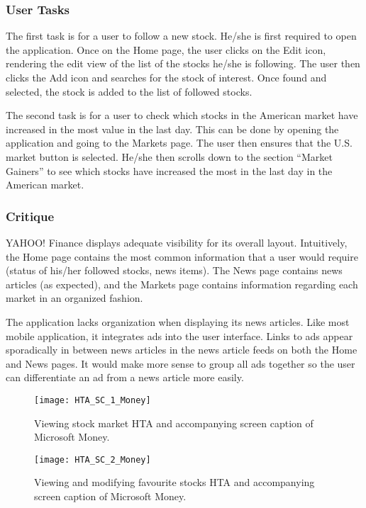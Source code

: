 \documentclass{sigchi}
\begin{document}
\subsubsection{User Tasks}
The first task is for a user to follow a new stock. He/she is first required to open the application. Once on the Home page, the user clicks on the Edit icon, rendering the edit view of the list of the stocks he/she is following. The user then clicks the Add icon and searches for the stock of interest. Once found and selected, the stock is added to the list of followed stocks.\par

The second task is for a user to check which stocks in the American market have increased in the most value in the last day. This can be done by opening the application and going to the Markets page. The user then ensures that the U.S. market button is selected. He/she then scrolls down to the section “Market Gainers” to see which stocks have increased the most in the last day in the American market.


\subsubsection{Critique}
YAHOO! Finance displays adequate visibility for its overall layout. Intuitively, the Home page contains the most common information that a user would require (status of his/her followed stocks, news items). The News page contains news articles (as expected), and the Markets page contains information regarding each market in an organized fashion. \par

The application lacks organization when displaying its news articles. Like most mobile application, it integrates ads into the user interface. Links to ads appear sporadically in between news articles in the news article feeds on both the Home and News pages. It would make more sense to group all ads together so the user can differentiate an ad from a news article more easily. 


\begin{figure*}
	\texttt{[image: HTA\_SC\_1\_Money]}
	\caption{Viewing stock market HTA and accompanying screen caption of Microsoft Money.}
	\label{fig:figure1}
\end{figure*}

\begin{figure*}
	\texttt{[image: HTA\_SC\_2\_Money]}
	\caption{Viewing and modifying favourite stocks HTA and accompanying screen caption of Microsoft Money.}
	\label{fig:figure2}
\end{figure*}
\end{document}
